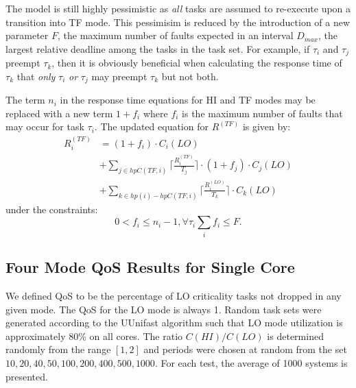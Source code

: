 	The model is still highly pessimistic as \emph{all} tasks are assumed to re-execute upon a transition into TF mode. 
	This pessimisim is reduced by the introduction of a new parameter $F$, the maximum number of faults expected in an interval $D_{max}$, the largest relative deadline among the tasks in the task set.
	For example, if $\tau_i$ and $\tau_j$ preempt $\tau_k$, then it is obviously beneficial when calculating the response time of $\tau_k$ that \emph{only} $\tau_i$ \emph{or} $\tau_j$ may preempt $\tau_k$ but not both.

	The term $n_i$ in the response time equations for HI and TF modes may be replaced with a new term $1 + f_i$ where $f_i$ is the maximum number of faults that may occur for task $\tau_i$. The updated equation for $R^{(TF)}$ is given by:
	\begin{equation}\label{eq:mode3new}
\begin{aligned}
R_i^{(TF)} & = (1+f_i) \cdot C_i(LO) \\
&  +\sum_{j \in hpC(TF,i)}\Big\lceil\frac{R_i^{(TF)}}{T_j}\Big\rceil \cdot (1+f_j) \cdot C_j(LO) \\
&  +\sum_{k \in hp(i)-hpC(TF,i)}\Big\lceil\frac{R_i^{(LO)}}{T_k}\Big\rceil \cdot C_k(LO)
\end{aligned}
\end{equation}
under the constraints:
\begin{subequations}
\begin{equation}
0 < f_i \le n_i - 1,  \forall \tau_i
\end{equation}
\begin{equation}
\sum_i{f_i} \le F.
\end{equation}
\end{subequations}

\subsection{Four Mode QoS Results for Single Core}
\label{s:singlecore-results}
	We defined QoS to be the percentage of LO criticality tasks not dropped in any given mode. The QoS for the LO mode is always 1. Random task sets were generated according to the UUnifast algorithm \cite{bini2005measuring} such that LO mode utilization is approximately 80\% on all cores. The ratio $C(HI)/C(LO)$ is determined randomly from the range $[1,2]$ and periods were chosen at random from the set ${10,20,40,50,100,200,400,500,1000}$. For each test, the average of 1000 systems is presented.

